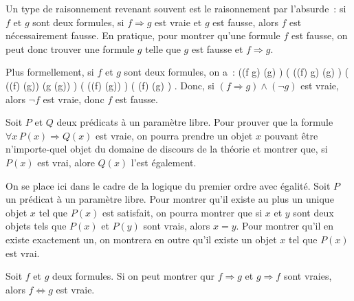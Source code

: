 \blank[medium]

\noindent
{} 
  Un type de raisonnement revenant souvent est le raisonnement par l'absurde : si $f$ et $g$ sont deux formules, si $f \Rightarrow g$ est vraie et $g$ est fausse, alors $f$ est nécessairement fausse. 
  En pratique, pour montrer qu'une formule $f$ est fausse, on peut donc trouver une formule $g$ telle que $g$ est fausse et $f \Rightarrow g$.

Plus formellement, si $f$ et $g$ sont deux formules, on a : 
\startformula
    \left((f \Rightarrow g) \wedge (\lnot g) \right)
    \Leftrightarrow \left( ((\lnot f) \vee g) \wedge (\lnot g) \right)
    \Leftrightarrow \left( ((\lnot f) \wedge (\lnot g)) \vee (g \wedge (\lnot g)) \right)
    \Leftrightarrow \left( ((\lnot f) \wedge (\lnot g)) \vee {} \right)
    \Leftrightarrow \left( (\lnot f) \wedge (\lnot g) \right) .
\stopformula
Donc, si $(f \Rightarrow g) \wedge (\lnot g)$ est vraie, alors $\lnot f$ est vraie, donc $f$ est fausse.

\blank[medium]

\noindent
{}  
  Soit $P$ et $Q$ deux prédicats à un paramètre libre. 
  Pour prouver que la formule $\forall x \, P(x) \Rightarrow Q(x)$ est vraie, on pourra prendre un objet $x$ pouvant être n'importe-quel objet du domaine de discours de la théorie et montrer que, si $P(x)$ est vrai, alore $Q(x)$ l'est également.

\blank[medium]

\noindent
{} 
  On se place ici dans le cadre de la logique du premier ordre avec égalité.
  Soit $P$ un prédicat à un paramètre libre. 
  Pour montrer qu'il existe au plus un unique objet $x$ tel que $P(x)$ est satisfait, on pourra montrer que si $x$ et $y$ sont deux objets tels que $P(x)$ et $P(y)$ sont vrais, alors $x = y$.
  Pour montrer qu'il en existe exactement un, on montrera en outre qu'il existe un objet $x$ tel que $P(x)$ est vrai.

\blank[medium]

\noindent
{} 
  Soit $f$ et $g$ deux formules. 
  Si on peut montrer qur $f \Rightarrow g$ et $g \Rightarrow f$ sont vraies, alors $f \Leftrightarrow g$ est vraie.

\stopsubsection

\startsubsection[title=Un exemple : arc-en-ciel à minuit ?]

